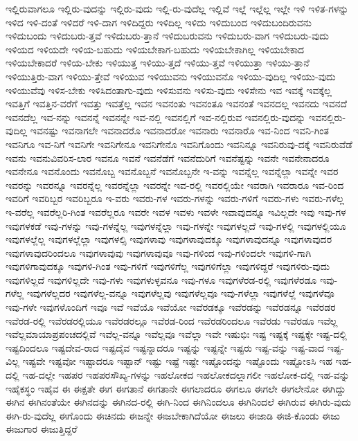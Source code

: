 {ಇಲ್ಲಿರುವಾಗಲೂ
ಇಲ್ಲಿರು-ವುದನ್ನು
ಇಲ್ಲಿರು-ವುದು
ಇಲ್ಲಿ-ರು-ವುದೆಲ್ಲ
ಇಲ್ಲಿವೆ
ಇಲ್ಲೆ
ಇಲ್ಲೆಲ್ಲ
ಇಲ್ಲೇ
ಇಳಿ
ಇಳಿತ-ಗಳನ್ನು
ಇಳಿದ
ಇಳಿ-ದಂತೆ
ಇಳಿದರೆ
ಇಳಿ-ದಾಗ
ಇಳಿದಿದ್ದರು
ಇಳಿದಿಲ್ಲ
ಇಳಿದು
ಇಳಿದುಬಂದ
ಇಳಿದುಬಂದಿರುವನು
ಇಳಿದುಬಂದು
ಇಳಿದುಬರು-ತ್ತವೆ
ಇಳಿದುಬರು-ತ್ತಾನೆ
ಇಳಿದುಬರುವನು
ಇಳಿದುಬರು-ವಾಗ
ಇಳಿದುಬರು-ವುದು
ಇಳಿಯದ
ಇಳಿಯದೇ
ಇಳಿಯ-ಬಹುದು
ಇಳಿಯಬೇಕಾಗ-ಬಹುದು
ಇಳಿಯಬೇಕಾಗಿಲ್ಲ
ಇಳಿಯಬೇಕಾದ
ಇಳಿಯಬೇಕಾದರೆ
ಇಳಿಯ-ಬೇಕು
ಇಳಿಯುತ್ತ
ಇಳಿಯು-ತ್ತದೆ
ಇಳಿಯು-ತ್ತವೆ
ಇಳಿಯುತ್ತಾ
ಇಳಿಯು-ತ್ತಾನೆ
ಇಳಿಯುತ್ತಿರು-ವಾಗ
ಇಳಿಯು-ತ್ತೇವೆ
ಇಳಿಯುವ
ಇಳಿಯುವನು
ಇಳಿಯುವನೊ
ಇಳಿಯು-ವುದಿಲ್ಲ
ಇಳಿಯು-ವುದು
ಇಳಿಯುವೆವು
ಇಳಿಸ-ಬೇಕು
ಇಳಿಸಿದಂತಾಗು-ವುದು
ಇಳಿಸುವನು
ಇಳಿಸು-ವುದು
ಇಳಿಸೇನು
ಇವ
ಇವಕ್ಕೆ
ಇವಕ್ಕೆಲ್ಲ
ಇವತ್ತಿಗೆ
ಇವತ್ತಿನ-ವರೆಗೆ
ಇವತ್ತು
ಇವತ್ತೆಲ್ಲ
ಇವನ
ಇವನಂತು
ಇವನಂತೂ
ಇವನಂತೆ
ಇವನದಲ್ಲ
ಇವನದು
ಇವನದೆ
ಇವನದೆಲ್ಲ
ಇವ-ನನ್ನು
ಇವನನ್ನೆ
ಇವನನ್ನೇ
ಇವ-ನಲ್ಲಿ
ಇವನಲ್ಲಿಗೆ
ಇವ-ನಲ್ಲಿರುವ
ಇವನಲ್ಲಿರು-ವುದನ್ನು
ಇವನಲ್ಲಿರು-ವುದಿಲ್ಲ
ಇವನಷ್ಟು
ಇವನಾಗಲೇ
ಇವನಾದರೊ
ಇವನಾದರೋ
ಇವನಾರು
ಇವನಾರೊ
ಇವ-ನಿಂದ
ಇವನಿ-ಗಿಂತ
ಇವನಿಗೂ
ಇವ-ನಿಗೆ
ಇವನಿಗೇ
ಇವನಿಗೇನೂ
ಇವನಿಗೇನೊ
ಇವನಿಗೊಂದು
ಇವನಿನ್ನೂ
ಇವನಿರುವು-ದಕ್ಕೆ
ಇವನಿರುವೆಡೆ
ಇವನು
ಇವನುವಿವರಿಸ-ಲಾರ
ಇವನೂ
ಇವನೆ
ಇವನೆಡೆಗೆ
ಇವನೆದುರಿಗೆ
ಇವನೆಷ್ಟನ್ನು
ಇವನೇ
ಇವನೇನಾದರೂ
ಇವನೇನೂ
ಇವನೊಂದು
ಇವನೊಬ್ಬ
ಇವನೊಬ್ಬನೆ
ಇವನೊಬ್ಬನೇ
ಇ-ವನ್ನು
ಇವನ್ನೆಲ್ಲ
ಇವನ್ನೆಲ್ಲಾ
ಇವನ್ನೇ
ಇವರ
ಇವರನ್ನು
ಇವರನ್ನೂ
ಇವರನ್ನೆಲ್ಲ
ಇವರನ್ನೆಲ್ಲಾ
ಇವರನ್ನೇ
ಇವ-ರಲ್ಲಿ
ಇವರಲ್ಲಿಯೇ
ಇವರಾಗಿ
ಇವರಾರೂ
ಇವ-ರಿಂದ
ಇವರಿಗೆ
ಇವರಿಬ್ಬರ
ಇವರಿಬ್ಬರೂ
ಇ-ವರು
ಇವರು-ಗಳ
ಇವರು-ಗಳನ್ನು
ಇವರು-ಗಳಿಗೆ
ಇವರು-ಗಳು
ಇವರು-ಗಳೆಲ್ಲ
ಇ-ವರೆಲ್ಲ
ಇವರೆಲ್ಲರಿ-ಗಿಂತ
ಇವರೆಲ್ಲರೂ
ಇವರೇ
ಇವಳ
ಇವಳು
ಇವಳೇ
ಇವಾವುದನ್ನೂ
ಇವಿಲ್ಲದೇ
ಇವು
ಇವು-ಗಳ
ಇವುಗಳಕಡೆ
ಇವು-ಗಳನ್ನು
ಇವು-ಗಳನ್ನೆಲ್ಲ
ಇವುಗಳನ್ನೆಲ್ಲಾ
ಇವು-ಗಳನ್ನೇ
ಇವುಗಳಲ್ಲದೆ
ಇವು-ಗಳಲ್ಲಿ
ಇವುಗಳಲ್ಲಿಯೂ
ಇವುಗಳಲ್ಲೆಲ್ಲ
ಇವುಗಳಲ್ಲೆಲ್ಲಾ
ಇವುಗಳಲ್ಸಿ
ಇವುಗಳಾವು
ಇವುಗಳಾವುದಕ್ಕೂ
ಇವುಗಳಾವುದನ್ನೂ
ಇವುಗಳಾವುದರ
ಇವುಗಳಾವುದರಿಂದಲೂ
ಇವುಗಳಾವುವು
ಇವುಗಳಾವುವೂ
ಇವು-ಗಳಿಂದ
ಇವು-ಗಳಿಂದಲೇ
ಇವುಗಳಿ-ಗಾಗಿ
ಇವುಗಳಿಗಾವುದಕ್ಕೂ
ಇವುಗಳಿ-ಗಿಂತ
ಇವು-ಗಳಿಗೆ
ಇವುಗಳಿಗೆಲ್ಲ
ಇವುಗಳಿಗೆಲ್ಲಾ
ಇವುಗಳಿದ್ದರೆ
ಇವುಗಳಿರು-ವುದು
ಇವುಗಳಿಲ್ಲದೆ
ಇವುಗಳಿಲ್ಲದೇ
ಇವು-ಗಳು
ಇವುಗಳುಳ್ಳವನೂ
ಇವು-ಗಳೂ
ಇವುಗಳೆರಡ-ರಲ್ಲಿ
ಇವುಗಳೆರಡೂ
ಇವು-ಗಳೆಲ್ಲ
ಇವುಗಳೆಲ್ಲದರ
ಇವುಗಳೆಲ್ಲ-ವನ್ನೂ
ಇವುಗಳೆಲ್ಲವು
ಇವುಗಳೆಲ್ಲವೂ
ಇವು-ಗಳೆಲ್ಲಾ
ಇವುಗಳೆಲ್ಲೆ
ಇವುಗಳೆವೂ
ಇವು-ಗಳೇ
ಇವುಗಳೊಂದಿಗೆ
ಇವೂ
ಇವೆ
ಇವೆಯೊ
ಇವೆಯೋ
ಇವೆರಡಕ್ಕೂ
ಇವೆರಡನ್ನು
ಇವೆರಡನ್ನೂ
ಇವೆರಡರ
ಇವೆರಡ-ರಲ್ಲಿ
ಇವೆರಡರಲ್ಲಿಯೂ
ಇವೆರಡರಲ್ಲೂ
ಇವೆರಡ-ರಿಂದ
ಇವೆರಡರಿಂದಲೂ
ಇವೆರಡು
ಇವೆರಡೂ
ಇವೆಲ್ಲ
ಇವೆಲ್ಲಮಾಯಾಪ್ರಪಂಚದಲ್ಲಿವೆ
ಇವೆಲ್ಲ-ವನ್ನೂ
ಇವೆಲ್ಲವೂ
ಇವೆಲ್ಲಾ
ಇವೇ
ಇಷುಭಿಃ
ಇಷ್ಟ
ಇಷ್ಟಕ್ಕೆ
ಇಷ್ಟಕ್ಕೇ
ಇಷ್ಟ-ದಲ್ಲಿ
ಇಷ್ಟದಿಂದಲೂ
ಇಷ್ಟದೇವ-ರಾದ
ಇಷ್ಟದೈವ
ಇಷ್ಟನ್ನಾದರೂ
ಇಷ್ಟನ್ನು
ಇಷ್ಟನ್ನೇ
ಇಷ್ಟರು
ಇಷ್ಟ-ವನ್ನು
ಇಷ್ಟ-ವಾದ
ಇಷ್ಟ-ವಿಲ್ಲ
ಇಷ್ಟವೇ
ಇಷ್ಟವೋ
ಇಷ್ಟಾದರೂ
ಇಷ್ಟಾನ್
ಇಷ್ಟು
ಇಷ್ಟೆ
ಇಷ್ಟೇ
ಇಷ್ಟೊಂದನ್ನು
ಇಷ್ಟೊಂದು
ಇಷ್ಟೋಽಸಿ
ಇಹ
ಇಹ-ದಲ್ಲಿ
ಇಹ-ದಲ್ಲೇ
ಇಹಪರ
ಇಹಪರಸೌಖ್ಯ-ಗಳನ್ನು
ಇಹಲೋಕದ
ಇಹಲೋಕದಲ್ಲಾಗಲೀ
ಇಹಲೋಕ-ದಲ್ಲಿ
ಇಹ-ವನ್ನು
ಇಹೈಕಸ್ಥಂ
ಇಹೈವ
ಈ
ಈಕ್ಷತೇ
ಈಗ
ಈಗತಾನೆ
ಈಗತಾನೇ
ಈಗಲಾದರೂ
ಈಗಲೂ
ಈಗಲೇ
ಈಗಲೇನೋ
ಈಗಿದ್ದು
ಈಗಿನ
ಈಗಿನಂತೆಯೇ
ಈಗಿನದನ್ನು
ಈಗಿನದ-ರಲ್ಲಿ
ಈಗಿ-ನಿಂದ
ಈಗಿನಿಂದಲೂ
ಈಗಿನಿಂದಲೆ
ಈಗಿರುವ
ಈಗಿರು-ವುದು
ಈಗಿ-ರು-ವುದೆಲ್ಲ
ಈಗೊಂದು
ಈಚಿನದು
ಈಜನ್ನೇ
ಈಜಬೇಕಾಗಿದೆಯೋ
ಈಜಲು
ಈಜಾಡಿ
ಈಜಿ-ಕೊಂಡು
ಈಜು
ಈಜುಗಾರ
ಈಜುತ್ತಿದ್ದರೆ
}
